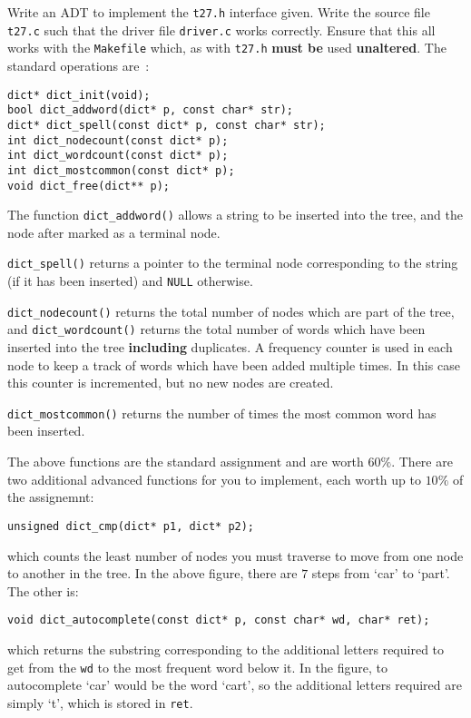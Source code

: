 \begin{exercise}
Write an ADT to implement the \verb^t27.h^ interface given.  Write the
source file \verb^t27.c^ such that the driver file \verb^driver.c^
works correctly.  Ensure that this all works with the \verb^Makefile^
which, as with \verb^t27.h^ {\bf must be} used {\bf unaltered}.
The standard operations are~:
\begin{verbatim}
dict* dict_init(void);
bool dict_addword(dict* p, const char* str);
dict* dict_spell(const dict* p, const char* str);
int dict_nodecount(const dict* p);
int dict_wordcount(const dict* p);
int dict_mostcommon(const dict* p);
void dict_free(dict** p);
\end{verbatim}

\noindent The function \verb^dict_addword()^ allows a string to be
inserted into the tree, and the node after marked as a terminal node.

\noindent \verb^dict_spell()^ returns a pointer to the terminal node
corresponding to the string (if it has been inserted) and \verb^NULL^
otherwise.

\noindent \verb^dict_nodecount()^ returns the total number of nodes
which are part of the tree, and \verb^dict_wordcount()^ returns the total
number of words which have been inserted into the tree {\bf including}
duplicates.  A frequency counter is used in each node to keep a track
of words which have been added multiple times. In this case this counter
is incremented, but no new nodes are created.

\noindent \verb^dict_mostcommon()^ returns the number of times the most
common word has been inserted.

\noindent The above functions are the standard assignment and are worth
$60\%$.  There are two additional advanced functions for you to implement, each
worth up to $10\%$ of the assignemnt:
\begin{verbatim}
unsigned dict_cmp(dict* p1, dict* p2);
\end{verbatim}
which counts the least number of nodes you must traverse to move from one node
to another in the tree. In the above figure, there are $7$ steps from `car'
to `part'. The other is:
\begin{verbatim}
void dict_autocomplete(const dict* p, const char* wd, char* ret);
\end{verbatim}
which returns the substring corresponding to the additional letters required to
get from the \verb^wd^ to the most frequent word below it. In the figure, to
autocomplete `car' would be the word `cart', so the additional letters required
are simply `t', which is stored in \verb^ret^.


\end{exercise}
